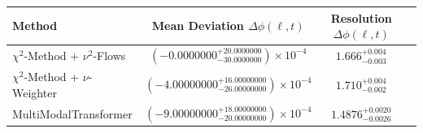     \begin{tabular}{lccc}
        \toprule
        Method & Mean Deviation $\Delta\phi(\ell, t)$ & Resolution $\Delta\phi(\ell, t)$ \\
        \midrule
        $\chi^2$-Method + $\nu^2$-Flows & $(-0.0000000^{+20.0000000}_{-30.0000000})\times 10^{-4}$ & $1.666^{+0.004}_{-0.003}$ \\
        $\chi^2$-Method + $\nu$-Weighter & $(-4.00000000^{+16.00000000}_{-26.00000000})\times 10^{-4}$ & $1.710^{+0.004}_{-0.002}$ \\
        MultiModalTransformer & $(-9.00000000^{+18.00000000}_{-20.00000000})\times 10^{-4}$ & $1.4876^{+0.0020}_{-0.0026}$ \\
        \bottomrule
    \end{tabular}